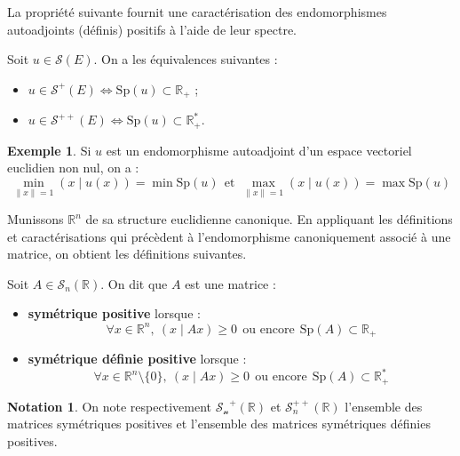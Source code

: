 \documentclass[french]{article}
\newcommand{\R}{\mathbb{R}}
\newcommand{\st}{^*}
\theoremstyle{plain}
\theoremstyle{definition}
\newtheorem*{ex}{Exemple}
\newtheorem*{notation}{Notation}
\theoremstyle{remark}
\begin{document}
La propriété suivante fournit une caractérisation des endomorphismes autoadjoints (définis) positifs à l'aide de leur spectre.

\begin{prop}
	Soit $u\in\mathcal{S}(E)$. On a les équivalences suivantes : 
	\begin{itemize}
		\item $u\in\mathcal{S}^+(E)\iff \text{Sp}(u)\subset\R_+$ ;
		\item $u\in\mathcal{S}^{++}(E)\iff \text{Sp}(u)\subset\R_+\st$.
	\end{itemize}
\end{prop}

\begin{ex}
	Si $u$ est un endomorphisme autoadjoint d'un espace vectoriel euclidien non nul, on a : $$\underset{\lVert x\rVert=1}{\min}(x\mid u(x))=\min\text{Sp}(u)\ \ \text{et}\ \ \underset{\lVert x\rVert=1}{\max}(x\mid u(x))=\max\text{Sp}(u)$$
\end{ex}

Munissons $\R^n$ de sa structure euclidienne canonique. En appliquant les définitions et caractérisations qui précèdent à l'endomorphisme canoniquement associé à une matrice, on obtient les définitions suivantes.

\begin{dfn}
	Soit $A\in\mathcal{S}_n(\R)$. On dit que $A$ est une matrice :
	\begin{itemize}
		\item \textbf{symétrique positive} lorsque : $$\forall x\in\R^n,\ (x\mid Ax)\geqslant 0\ \ \text{ou encore}\ \ \text{Sp}(A)\subset\R_+$$
		\item \textbf{symétrique définie positive} lorsque : $$\forall x\in\R^n\setminus\{0\},\ (x\mid Ax)\geqslant 0\ \ \text{ou encore}\ \ \text{Sp}(A)\subset\R_+\st$$
	\end{itemize}
\end{dfn}

\begin{notation}
	On note respectivement $\mathcal{S_n}^+(\R)$ et $\mathcal{S}_n^{++}(\R)$ l'ensemble des matrices symétriques positives et l'ensemble des matrices symétriques définies positives.
\end{notation}
\end{document}
